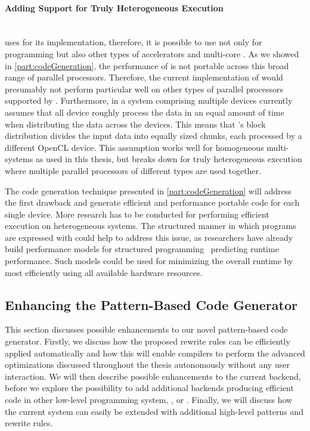 \paragraph{Adding Support for Truly Heterogeneous Execution}\hfill\\
\SkelCL uses \OpenCL for its implementation, therefore, it is possible to use \SkelCL not only for programming \GPUs but also other types of accelerators and multi-core \CPUs.
As we showed in \autoref{part:codeGeneration}, the performance of \OpenCL is not portable across this broad range of parallel processors.
Therefore, the current implementation of \SkelCL would presumably not perform particular well on other types of parallel processors supported by \OpenCL.
Furthermore, in a system comprising multiple \OpenCL devices \SkelCL currently assumes that all device roughly process the data in an equal amount of time when distributing the data across the devices.
This means that \SkelCL's block distribution divides the input data into equally sized chunks, each processed by a different OpenCL device.
This assumption works well for homogeneous multi-\GPU systems as used in this thesis, but breaks down for truly heterogeneous execution where multiple parallel processors of different types are used together.

The code generation technique presented in \autoref{part:codeGeneration} will address the first drawback and generate efficient and performance portable code for each single \OpenCL device.
More research has to be conducted for performing efficient execution on heterogeneous systems.
The structured manner in which programs are expressed with \SkelCL could help to address this issue, as researchers have already build performance models for structured programming~\cite{HayashiC02,BischofGK03,Alt2007,DarlingtonFHKSW93,StegmeierFrJAUn2015} predicting runtime performance.
Such models could be used for minimizing the overall runtime by most efficiently using all available hardware resources.


\subsection{Enhancing the Pattern-Based Code Generator}
\label{section:future-work:codeGenerator}

This section discusses possible enhancements to our novel pattern-based code generator.
Firstly, we discuss how the proposed rewrite rules can be efficiently applied automatically and how this will enable compilers to perform the advanced optimizations discussed throughout the thesis autonomously without any user interaction.
We will then describe possible enhancements to the current \OpenCL backend, before we explore the possibility to add additional backends producing efficient code in other low-level programming system, \eg, \OpenMP or \MPI.
Finally, we will discuss how the current system can easily be extended with additional high-level patterns and rewrite rules.

